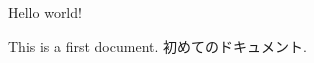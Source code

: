 \documentclass{jlreq}
\begin{document}
Hello world!

This is a first document.
初めてのドキュメント.
\end{document}

